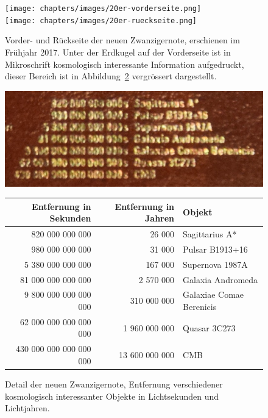 \begin{figure}
\centering
\texttt{[image: chapters/images/20er-vorderseite.png]}
\\[10pt]
\texttt{[image: chapters/images/20er-rueckseite.png]}
\caption{Vorder- und Rückseite der neuen Zwanzigernote, erschienen
im Frühjahr 2017.
Unter der Erdkugel auf der Vorderseite ist in Mikroschrift kosmologisch
interessante Information aufgedruckt, dieser Bereich ist in
Abbildung~\ref{skript:einleitung:detail} vergrössert dargestellt.
\label{skript:einleitung:detail}}
\end{figure}

\begin{figure}
\begin{center}
\includegraphics[width=\hsize]{chapters/images/notendetail2.jpg}
\medskip

\begin{tabular}{|r|r|l|}
\hline
 Entfernung in Sekunden&Entfernung in Jahren&Objekt                    \\
\hline
        820 000 000 000&              26 000&Sagittarius A*            \\
        980 000 000 000&              31 000&Pulsar B1913+16           \\
      5 380 000 000 000&             167 000&Supernova 1987A           \\
     81 000 000 000 000&           2 570 000&Galaxia Andromeda         \\
  9 800 000 000 000 000&         310 000 000 &Galaxiae Comae Berenicis \\
 62 000 000 000 000 000&       1 960 000 000&Quasar 3C273              \\
430 000 000 000 000 000&      13 600 000 000&CMB                       \\
\hline
\end{tabular}
\end{center}
\caption{Detail der neuen Zwanzigernote, Entfernung verschiedener
kosmologisch interessanter Objekte in Lichtsekunden und Lichtjahren.
\label{skript:einleitung:detail}}
\end{figure}

